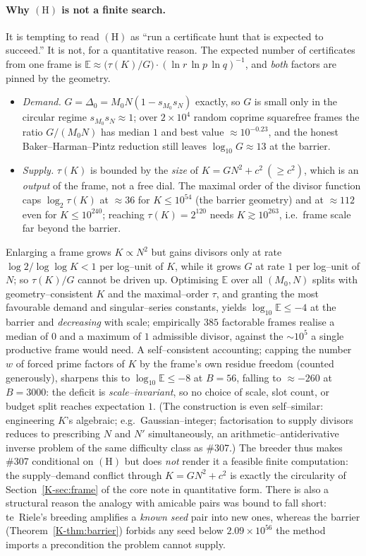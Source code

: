 \documentclass[11pt]{article}
\theoremstyle{definition}
\begin{document}
\paragraph{Why $(\mathrm{H})$ is not a finite search.} It is tempting to read $(\mathrm{H})$ as
``run a certificate hunt that is expected to succeed.'' It is not, for a quantitative reason. The
expected number of certificates from one frame is $\mathbb{E}\approx
\bigl(\tau(K)/G\bigr)\cdot(\ln r\,\ln p\,\ln q)^{-1}$, and \emph{both} factors are pinned by the
geometry.
\begin{itemize}[leftmargin=1.4em]
\item \emph{Demand.} $G=\Delta_0=M_0N(1-s_{M_0}s_N)$ exactly, so $G$ is small only in the circular
regime $s_{M_0}s_N\approx1$; over $2\times10^4$ random coprime squarefree frames the ratio
$G/(M_0N)$ has median $1$ and best value $\approx10^{-0.23}$, and the honest Baker--Harman--Pintz
reduction still leaves $\log_{10}G\approx13$ at the barrier.
\item \emph{Supply.} $\tau(K)$ is bounded by the \emph{size} of $K=GN^2+c^2\ (\ge c^2)$, which is an
\emph{output} of the frame, not a free dial. The maximal order of the divisor function
\cite[Thm.~317]{HardyWright} caps $\log_2\tau(K)$ at $\approx36$ for $K\le10^{54}$ (the barrier
geometry) and at $\approx112$ even for $K\le10^{240}$; reaching $\tau(K)=2^{120}$ needs
$K\gtrsim10^{263}$, i.e.\ frame scale far beyond the barrier.
\end{itemize}
Enlarging a frame grows $K\propto N^2$ but gains divisors only at rate $\log2/\log\log K<1$ per
log--unit of $K$, while it grows $G$ at rate $1$ per log--unit of $N$; so $\tau(K)/G$ cannot be
driven up. Optimising $\mathbb{E}$ over all $(M_0,N)$ splits with geometry--consistent $K$ and the
maximal--order $\tau$, and granting the most favourable demand and singular--series constants, yields
$\log_{10}\mathbb{E}\le-4$ at the barrier and \emph{decreasing} with scale; empirically $385$
factorable frames realise a median of $0$ and a maximum of $1$ admissible divisor, against the
$\sim10^{5}$ a single productive frame would need. A self--consistent accounting; capping the
number $w$ of forced prime factors of $K$ by the frame's own residue freedom (counted generously),
sharpens this to $\log_{10}\mathbb{E}\le-8$ at $B=56$, falling to $\approx-260$ at $B=3000$: the
deficit is \emph{scale--invariant}, so no choice of scale, slot count, or budget split reaches
expectation $1$. (The construction is even self--similar: engineering $K$'s algebraic; e.g.\
Gaussian--integer; factorisation to supply divisors reduces to prescribing $N$ and $N'$
simultaneously, an arithmetic--antiderivative inverse problem of the same difficulty class as \#307.)
The breeder thus makes \#307 conditional on $(\mathrm{H})$ but does \emph{not} render it a feasible
finite computation: the supply--demand conflict through $K=GN^2+c^2$ is exactly the circularity of
Section~\ref{K-sec:frame} of the core note in quantitative form. There is also a structural reason the analogy with
amicable pairs was bound to fall short: te~Riele's breeding amplifies a \emph{known seed} pair into
new ones, whereas the barrier (Theorem~\ref{K-thm:barrier}) forbids any seed below $2.09\times10^{56}$
the method imports a precondition the problem cannot supply.
\end{document}

